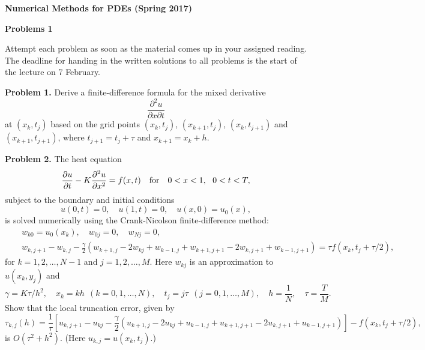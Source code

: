 \documentclass[10pt]{article}
\begin{document}
\begin{center}
{\large {\bf Numerical Methods for PDEs (Spring 2017)}}
\end{center}


\begin{center}
{\large {\bf Problems 1}}
\end{center}

\vskip 0.5cm
\noindent
Attempt each problem as soon as the material comes up in your assigned reading. The deadline for handing in the written solutions 
to all problems is the start of the lecture on 7 February.

\vskip 0.5cm
\noindent
{\bf Problem 1.} Derive a finite-difference formula for
the mixed derivative
\[
\frac{\partial^2 u}{\partial x\partial t}
\]
at $(x_{k},t_{j})$ based on the grid points $(x_{k},t_{j})$, $(x_{k+1},t_{j})$, $(x_{k},t_{j+1})$ and
$(x_{k+1},t_{j+1})$, where $t_{j+1}=t_{j}+\tau$ and $x_{k+1}=x_{k}+h$.


\vskip 0.5cm
\noindent
{\bf Problem 2.} The heat equation
\begin{equation}
\frac{\partial u}{\partial t}-K \frac{\partial^{2}u}{\partial
x^{2}}=f(x,t) \quad \hbox{for} \quad 0<x<1, \ \ 0 < t < T, \label{1}
\end{equation}
subject to the boundary and initial conditions
\begin{equation}
u(0,t)=0, \quad u(1, t)=0, \quad u(x,0)=u_{0}(x), \label{2}
\end{equation}
is solved numerically using the Crank-Nicolson finite-difference method:
\begin{eqnarray}
&&w_{k0}=u_{0}(x_{k}), \quad w_{0j}=0, \quad w_{Nj}=0,   \nonumber \\
&&w_{k,j+1}-w_{k,j}-\frac{\gamma}{2} \left(
w_{k+1,j}-2w_{kj}+w_{k-1,j}+w_{k+1,j+1}-2w_{k,j+1}+w_{k-1,j+1}\right)
=\tau f(x_{k}, t_{j}+\tau/2),  \label{4}
\end{eqnarray}
for $k=1, 2, \dots , N-1$ and $j=1, 2, \dots,M$.
Here $w_{kj}$ is an approximation to $u(x_{k}, y_{j})$ and
\[
\gamma=K\tau/h^{2}, \quad x_{k}=k h \ \ (k=0,1,\dots,N), \quad
t_{j}=j \tau \ \ (j=0,1,\dots,M), \quad h=\frac{1}{N}, \quad \tau=\frac{T}{M}.
\]
Show that the local truncation error, given by
\[
\tau_{k,j}(h)=\frac{1}{\tau}\left[u_{k,j+1}-u_{kj}-\frac{\gamma}{2}
\left(
u_{k+1,j}-2u_{kj}+u_{k-1,j}+u_{k+1,j+1}-2u_{k,j+1}+u_{k-1,j+1}\right)\right]
-f(x_{k}, t_{j}+\tau/2),
\]
is $O(\tau^{2}+h^{2})$. (Here $u_{k,j}=u(x_{k}, t_{j})$.)
\end{document}
